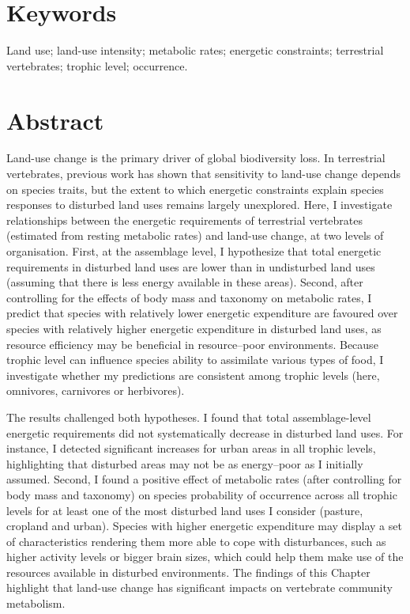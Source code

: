 
\section*{Keywords}
Land use; land-use intensity; metabolic rates; energetic constraints; terrestrial vertebrates; trophic level; occurrence.

\section*{Abstract}
Land-use change is the primary driver of global biodiversity loss. In terrestrial vertebrates, previous work has shown that sensitivity to land-use change depends on species traits, but the extent to which energetic constraints explain species responses to disturbed land uses remains largely unexplored. Here, I investigate relationships between the energetic requirements of terrestrial vertebrates (estimated from resting metabolic rates) and land-use change, at two levels of organisation. First, at the assemblage level, I hypothesize that total energetic requirements in disturbed land uses are lower than in undisturbed land uses (assuming that there is less energy available in these areas). Second, after controlling for the effects of body mass and taxonomy on metabolic rates, I predict that species with relatively lower energetic expenditure are favoured over species with relatively higher energetic expenditure in disturbed land uses, as resource efficiency may be beneficial in resource--poor environments. Because trophic level can influence species ability to assimilate various types of food, I investigate whether my predictions are consistent among trophic levels (here, omnivores, carnivores or herbivores). 

The results challenged both hypotheses. I found that total assemblage-level energetic requirements did not systematically decrease in disturbed land uses. For instance, I detected significant increases for urban areas in all trophic levels, highlighting that disturbed areas may not be as energy--poor as I initially assumed. Second, I found a positive effect of metabolic rates (after controlling for body mass and taxonomy) on species probability of occurrence across all trophic levels for at least one of the most disturbed land uses I consider (pasture, cropland and urban). Species with higher energetic expenditure may display a set of characteristics rendering them more able to cope with disturbances, such as higher activity levels or bigger brain sizes, which could help them make use of the resources available in disturbed environments. The findings of this Chapter highlight that land-use change has significant impacts on vertebrate community metabolism. 


